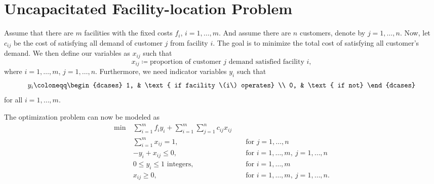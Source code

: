 \section{Uncapacitated Facility-location Problem}
Assume that there are \(m\) facilities with the fixed costs \(f_{i}\), \(i = 1, \ldots , m\). And assume there are \(n\) customers,
denote by \(j = 1, \ldots , n\). Now, let \(c_{ij}\) be the cost of satisfying all demand of customer \(j\) from facility \(i\).
The goal is to minimize the total cost of satisfying all customer's demand. We then define our variables as \(x_{ij}\) such that
\[
	x_{ij} \coloneqq  \text{proportion of customer \(j\) demand satisfied facility \(i\)},
\]
where \(i = 1, \ldots , m\), \(j = 1, \ldots , n\). Furthermore, we need indicator variables \(y_{i}\) such that
\[
	y_{i}\coloneqq \begin{dcases}
		1, & \text{ if facility \(i\) operates} \\
		0, & \text{ if not}
	\end{dcases}
\]
for all \(i = 1, \ldots , m\).

The optimization problem can now be modeled as
\begin{align*}
	\min~ & \sum\limits_{i=1}^{m} f_{i}y_{i} + \sum\limits_{i=1}^{m}\sum\limits_{j=1}^{n} c_{ij}x_{ij}                                                         \\
	      & \sum\limits_{i=1}^{m} x_{ij} = 1,                                                          &  & \text{ for }j = 1, \ldots , n                      \\
	      & -y_{i} + x_{ij}\leq 0,                                                                     &  & \text{ for }i = 1, \ldots , m,\ j = 1, \ldots , n  \\
	      & 0\leq y_{i}\leq 1 \text{ integers},                                                        &  & \text{ for }i = 1, \ldots , m                      \\
	      & x_{ij}\geq 0,                                                                              &  & \text{ for }i = 1, \ldots , m,\ j = 1, \ldots , n.
\end{align*}

